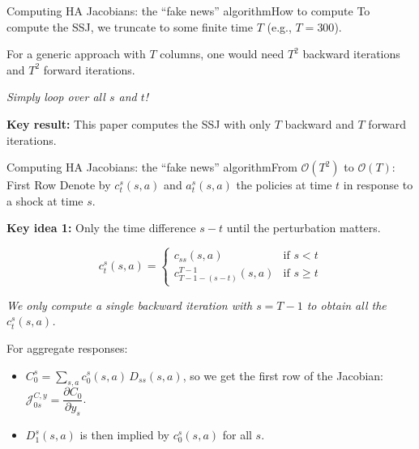 \documentclass[aspectratio=169]{beamer}
\begin{document}
\begin{frame}{Computing HA Jacobians: the ``fake news'' algorithm}{How to compute}
    To compute the SSJ, we truncate to some finite time $T$ (e.g., $T = 300$).


    For a generic approach with $T$ columns, one would need $T^2$ backward iterations and $T^2$ forward iterations. 
    
    \emph{Simply loop over all $s$ and $t$!}

    \vspace{0.5em}


    \textbf{Key result:} This paper computes the SSJ with only $T$ backward and $T$ forward iterations.

\end{frame}

\begin{frame}{Computing HA Jacobians: the ``fake news'' algorithm}{From $\mathcal{O}(T^2)$ to $\mathcal{O}(T)$: First Row}
    Denote by $c_t^s(s,a)$ and $a_t^s(s,a)$ the policies at time $t$ in response to a shock at time $s$.

    \vspace{0.6em}

    \textbf{Key idea 1:} Only the time difference $s-t$ until the perturbation matters.

    \[
    c_t^s(s,a) =
    \begin{cases}
        c_{ss}(s,a) & \text{if } s < t \\[0.8em]
        c_{T-1-(s-t)}^{T-1}(s,a) & \text{if } s \geq t
    \end{cases}
    \]

    \emph{We only compute a single backward iteration with $s = T-1$ to obtain all the $c_t^s(s,a)$.}

    \vspace{0.6em}

    For aggregate responses:
    \begin{itemize}
        \item $C_0^s = \sum_{s,a} c_0^s(s,a)\, D_{ss}(s,a)$, so we get the \alert{first row} of the Jacobian: $\mathcal{J}_{0s}^{C,y} = \dfrac{\partial C_0}{\partial y_s}$.
        \item $D_1^s(s,a)$ is then implied by $c_0^s(s,a)$ for all $s$.
    \end{itemize}
\end{frame}
\end{document}
